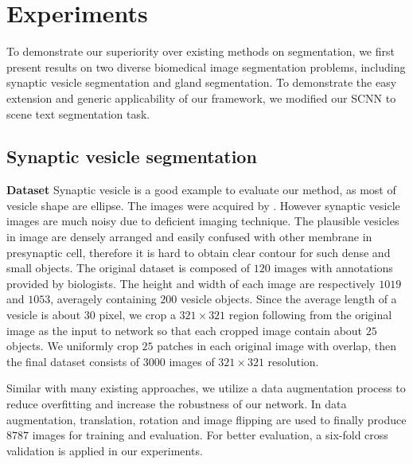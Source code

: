 \section{Experiments}
\label{sec:results}
To demonstrate our superiority over existing methods on segmentation, we first present results on two diverse biomedical image segmentation problems, including synaptic vesicle segmentation and gland segmentation.
To demonstrate the easy extension and generic applicability of our framework, we modified our SCNN to scene text segmentation task.

\subsection{Synaptic vesicle segmentation}
\noindent\textbf{Dataset}
Synaptic vesicle is a good example to evaluate our method, as most of vesicle shape are ellipse.
The images were acquired by . 
However synaptic vesicle images are much noisy due to deficient imaging technique.
The plausible vesicles in image are densely arranged and easily confused with other membrane in presynaptic cell, therefore it is hard to obtain clear contour for such dense and small objects.
The original dataset is composed of $120$ images with annotations provided by biologists.
The height and width of each image are respectively $1019$ and $1053$, averagely containing $200$ vesicle objects.
Since the average length of a vesicle is about $30$ pixel, we crop a $321\times 321$ region following \cite{Chen2014a} from the original image as the input to network so that each cropped image contain about $25$ objects.
We uniformly crop $25$ patches in each original image with overlap, then the final dataset consists of $3000$ images of $321\times 321$ resolution.

Similar with many existing approaches, we utilize a data augmentation process to reduce overfitting and increase the robustness of our network.
In data augmentation, translation, rotation and image flipping are used to finally produce $8787$ images for training and evaluation.
For better evaluation, a six-fold cross validation is applied in our experiments.
%


